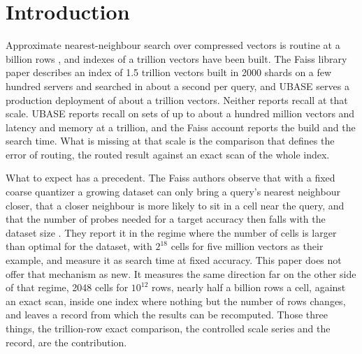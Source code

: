 \documentclass[sigconf, nonacm]{acmart}
\begin{document}
\maketitle

\vldbtopmatter

\section{Introduction}

Approximate nearest-neighbour search over compressed vectors is routine at a billion rows
\cite{jegou2011product,johnson2019faiss,subramanya2019diskann,chen2021spann}, and indexes of a
trillion vectors have been built. The Faiss library paper \cite{douze2024faiss} describes an
index of 1.5 trillion vectors built in 2000 shards on a few hundred servers and searched in about a
second per query, and UBASE \cite{tian2026ubase} serves a production deployment of about a trillion
vectors. Neither reports recall at that scale. UBASE reports recall on sets of up to about a hundred
million vectors and latency and memory at a trillion, and the Faiss account reports the build and
the search time. What is missing at that scale is the comparison that defines the error of routing,
the routed result against an exact scan of the whole index.

What to expect has a precedent. The Faiss authors observe that with a fixed coarse quantizer a
growing dataset can only bring a query's nearest neighbour closer, that a closer neighbour is more
likely to sit in a cell near the query, and that the number of probes needed for a target accuracy
then falls with the dataset size \cite[Section~5.1]{douze2024faiss}. They report it in the regime
where the number of cells is larger than optimal for the dataset, with $2^{18}$ cells for five
million vectors as their example, and measure it as search time at fixed accuracy. This paper does
not offer that mechanism as new. It measures the same direction far on the other side of that
regime, 2048 cells for $10^{12}$ rows, nearly half a billion rows a cell, against an exact scan,
inside one index where nothing but the number of rows changes, and leaves a record from which the
results can be recomputed. Those three things, the trillion-row exact comparison, the controlled
scale series and the record, are the contribution.
\end{document}

